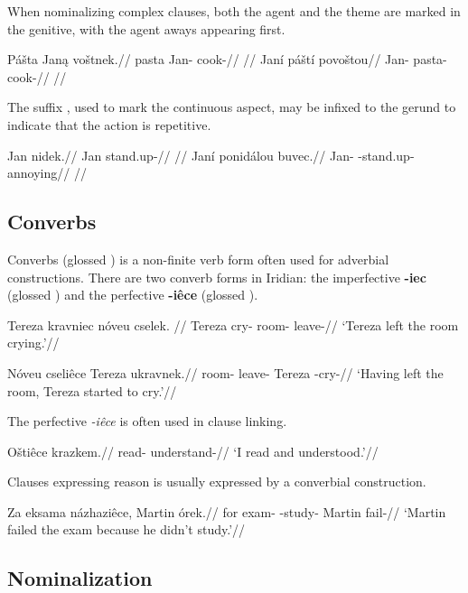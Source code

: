 When nominalizing complex clauses, both the agent and the theme are marked in the genitive, with the agent aways appearing first.

\pex
\a
\begingl
\gla P\'a\v{s}ta Jan\k{a} vo\v{s}tnek.//
\glb pasta Jan- cook-//
\glft {}//
\endgl
\a
\begingl
\gla Jan\'i p\'a\v{s}t\'i povo\v{s}tou//
\glb Jan- pasta- cook-//
\glft {}//
\endgl
\xe

The suffix , used to mark the continuous aspect, may be infixed to the gerund to indicate that the action is repetitive.

\pex
\a
\begingl
\gla Jan nidek.//
\glb Jan stand.up-//
\glft {}//
\endgl
\a
\begingl
\gla Jan\'i ponid\'alou buvec.//
\glb Jan- -stand.up- annoying//
\glft {}//
\endgl
\xe

\subsection{Converbs}
Converbs (glossed ) is a non-finite verb form often used for adverbial constructions. There are two converb forms in Iridian: the imperfective \textbf{-iec} (glossed ) and the perfective \textbf{-iêce} (glossed ).

\pex
\begingl
\gla Tereza kravniec nóveu cselek. //
\glb Tereza cry- room- leave-//
\glft `Tereza left the room crying.'//
\endgl
\xe

\pex
\begingl
\gla Nóveu cseliêce Tereza ukravnek.//
\glb room- leave- Tereza -cry-//
\glft `Having left the room, Tereza started to cry.'//
\endgl
\xe

The perfective \textit{-iêce} is often used in clause linking.

\pex
\begingl
\gla O\v{s}tiêce krazkem.//
\glb read- understand-//
\glft `I read and understood.'//
\endgl
\xe

Clauses expressing reason is usually expressed by a converbial construction.

\pex
\begingl
\gla Za eksama názhaziêce, Martin órek.//
\glb for exam- -study- Martin fail-//
\glft `Martin failed the exam because he didn't study.'//
\endgl
\xe


\subsection{Nominalization}




